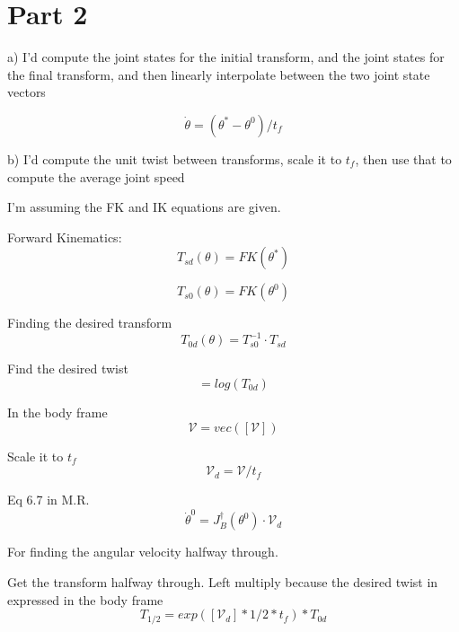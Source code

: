 \documentclass[11pt]{article}
\begin{document}
\section{Part 2}
a) I'd compute the joint states for the initial transform, and the joint states for the final transform, and then linearly interpolate between the two joint state vectors

\begin{equation}
	\dot{\theta} = (\theta^* - \theta^0) / t_f
\end{equation}


b) I'd compute the unit twist between transforms, scale it to $t_f$, then use that to compute the average joint speed

I'm assuming the FK and IK equations are given.

Forward Kinematics:
\begin{equation}
	T_{sd}(\theta) = FK(\theta^*)
\end{equation}

\begin{equation}
	T_{s0}(\theta) = FK(\theta^0)
\end{equation}

Finding the desired transform
\begin{equation}
	T_{0d}(\theta) = T_{s0}^{-1} \cdot T_{sd}
\end{equation}

Find the desired twist
\begin{equation}
	[\mathcal{V}] = log(T_{0d})
\end{equation}

In the body frame
\begin{equation}
	\mathcal{V} = vec([\mathcal{V}])
\end{equation}

Scale it to $t_f$
\begin{equation}
	\mathcal{V}_d = \mathcal{V} / t_f
\end{equation}


Eq 6.7 in M.R.
\begin{equation}
	\dot \theta^0 = J_B^{\dagger}(\theta^0) \cdot \mathcal{V}_d
\end{equation}

For finding the angular velocity halfway through.

Get the transform halfway through. Left multiply because the desired twist in expressed in the body frame
\begin{equation}
	T_{1/2} = exp([\mathcal{V}_d] * 1/2 * t_f) * T_{0d}
\end{equation}
\end{document}
